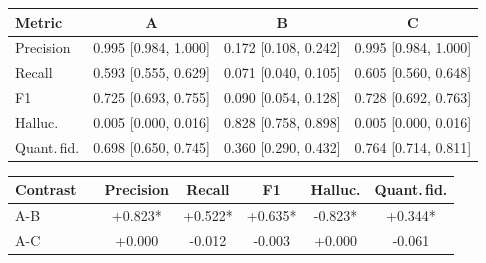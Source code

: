 \begin{tabular}{lccc}
\toprule
Metric & A & B & C \\
\midrule
Precision & 0.995 [0.984, 1.000] & 0.172 [0.108, 0.242] & 0.995 [0.984, 1.000] \\
Recall & 0.593 [0.555, 0.629] & 0.071 [0.040, 0.105] & 0.605 [0.560, 0.648] \\
F1 & 0.725 [0.693, 0.755] & 0.090 [0.054, 0.128] & 0.728 [0.692, 0.763] \\
Halluc. & 0.005 [0.000, 0.016] & 0.828 [0.758, 0.898] & 0.005 [0.000, 0.016] \\
Quant.\,fid. & 0.698 [0.650, 0.745] & 0.360 [0.290, 0.432] & 0.764 [0.714, 0.811] \\
\bottomrule
\end{tabular}

\begin{tabular}{llccccc}
\toprule
Contrast & & Precision & Recall & F1 & Halluc. & Quant.\,fid. \\
\midrule
A-B & & +0.823* & +0.522* & +0.635* & -0.823* & +0.344* \\
A-C & & +0.000 & -0.012 & -0.003 & +0.000 & -0.061 \\
\bottomrule
\end{tabular}
